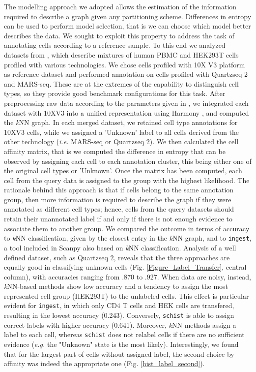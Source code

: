 \documentclass[10pt]{article}
\begin{document}
The modelling approach we adopted allows the estimation of the information required to describe a graph given any partitioning scheme. Differences in entropy can be used to perform model selection, that is we can choose which model better describes the data. We sought to exploit this property to address the task of annotating cells according to a reference sample. To this end we analyzed datasets from \cite{mereu_2020}, which describe mixtures of human PBMC and HEK293T cells profiled with various technologies. We chose cells profiled with 10X V3 platform as reference dataset and performed annotation on cells profiled with Quartzseq 2 and MARS-seq. These are at the extremes of the capability to distinguish cell types, so they provide good benchmark configurations for this task. After preprocessing raw data according to the parameters given in \cite{mereu_2020}, we integrated each dataset with 10XV3 into a unified representation using Harmony \cite{Korsunsky_2019}, and computed the \emph{k}NN graph. In each merged dataset, we retained cell type annotations for 10XV3 cells, while we assigned a 'Unknown' label to all cells derived from the other technology (\emph{i.e.} MARS-seq or Quartzseq 2). We then calculated the cell affinity matrix, that is we computed the difference in entropy that can be observed by assigning each cell to each annotation cluster, this being either one of the original cell types or 'Unknown'. Once the matrix has been computed, each cell from the query data is assigned to the group with the highest likelihood. The rationale behind this approach is that if cells belong to the same annotation group, then more information is required to describe the graph if they were annotated as different cell types; hence, cells from the query datasets should retain their unannotated label if and only if there is not enough evidence to associate them to another group. We compared the outcome in terms of accuracy to \emph{k}NN classification, given by the closest entry in the \emph{k}NN graph, and to \texttt{ingest}, a tool included in Scanpy also based on \emph{k}NN classification. Analysis of a well defined dataset, such as Quartzseq 2, reveals that the three approaches are equally good in classifying unknown cells (Fig. \ref{Figure_Label_Transfer}, central column), with accuracies ranging from .870 to .927. When data are noisy, instead, \emph{k}NN-based methods show low accuracy and a tendency to assign the most represented cell group (HEK293T) to the unlabeled cells. This effect is particular evident for \texttt{ingest}, in which only CD4 T cells and HEK cells are transfered, resulting in the lowest accuracy (0.243). Conversely, \texttt{schist} is able to assign correct labels with higher accuracy (0.641). Moreover, \emph{k}NN methods assign a label to each cell, whereas \texttt{schist} does not relabel cells if there are no sufficient evidence (\emph{e.g.} the "Unknown" state is the most likely). Interestingly, we found that for the largest part of cells without assigned label, the second choice by affinity was indeed the appropriate one (Fig. \ref{hist_label_second}).
\end{document}
